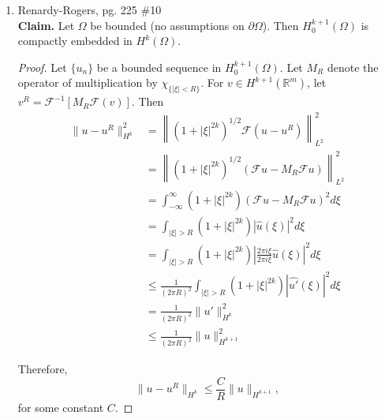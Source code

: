 \documentclass[a4paper]{article}
\newenvironment{claim}{\textbf{Claim.}}{}
\newcommand{\R}{\mathbb{R}}
\begin{document}
\begin{enumerate}
\begin{proof}
      Let $u_n \rightharpoonup u$ in $H^{k+1}(\Omega)$. By Lemma \ref{weak_bdd}, $\{u_n\}$ is a bounded sequence.
      By Theorem 7.29 in Renardy-Rogers, $H^{k+1}(\Omega)$ is compactly embedded in $H^k(\Omega)$. By definition, this means $\{u_n\}$ contains a
      subsequence $\{u_{n_k}\}$ such that
      \[ u_{n_k} \to u \quad \text{in } H^{k}(\Omega). \]
    \end{proof}

  \item Renardy-Rogers, pg. 225 \#10 \\
    \begin{claim}
      Let $\Omega$ be bounded (no assumptions on $\partial \Omega$). Then $H_0^{k+1}(\Omega)$ is compactly embedded in $H^k(\Omega)$.
    \end{claim}

    \begin{proof}
      Let $\{u_n\}$ be a bounded sequence in $H^{k+1}_0(\Omega)$. Let $M_R$ denote the operator of multiplication by $\chi_{ \{|\xi| < R \} }$. For $ v
      \in H^{k+1}(\R^m)$, let ${v^R = \mathcal{F}^{-1} \left[ M_R \mathcal{F} (v) \right] }$.
      Then
      \begin{align*}
        \| u - u^R \|_{H^k}^2 &= \left\| (1 + |\xi|^{2k})^{1/2} \mathcal{F} (u - u^R) \right\|_{L^2}^2 \\
        &= \left\| (1 + |\xi|^{2k})^{1/2} ( \mathcal{F}u - M_R \mathcal{F} u ) \right\|_{L^2}^2 \\
        &= \int_{-\infty}^{\infty} (1 + |\xi|^{2k}) ( \mathcal{F} u - M_R \mathcal{F} u)^2 d\xi \\
        &= \int_{|\xi|>R}^{} (1 + |\xi|^{2k}) |\hat{u} (\xi)|^2 d\xi \\
        &= \int_{|\xi|>R}^{} (1 + |\xi|^{2k}) \left| \frac{2 \pi i \xi}{2 \pi i \xi} \hat{u}(\xi) \right|^2 d\xi \\
        &\leq \frac{1}{(2 \pi R)^2} \int_{|\xi|>R}^{} (1 + |\xi|^{2k}) | \widehat{u'} (\xi) |^2 d \xi \\
        &= \frac{1}{(2 \pi R)^2} \|u'\|_{H^k}^2 \\
        &\leq \frac{1}{(2 \pi R)^2} \|u\|_{H^{k+1}}^2
      \end{align*}

      Therefore,
      \begin{equation} \label{cutoff_bound}
        \|u - u^R\|_{H^k} \leq \frac{C}{R} \|u\|_{H^{k+1}} ,
      \end{equation}
      for some constant $C$.


\end{proof}
\end{enumerate}
\end{document}
